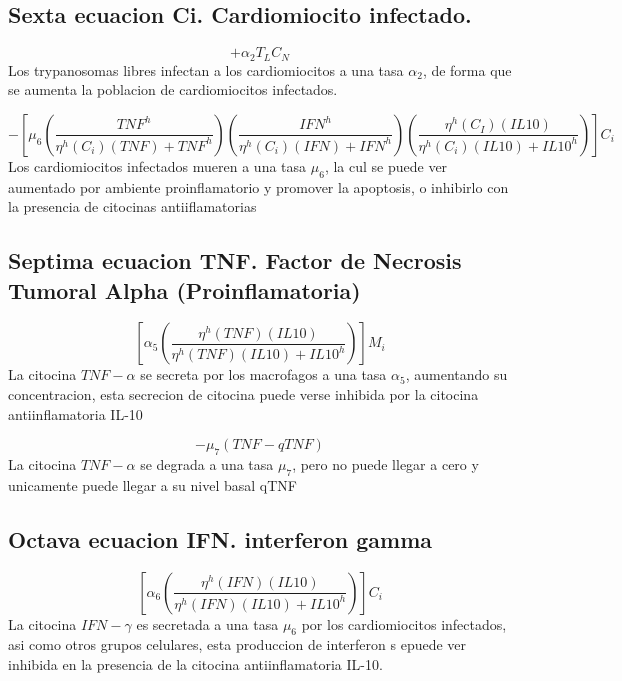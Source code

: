 \documentclass[
]{article}
\begin{document}
\hypertarget{sexta-ecuacion-ci.-cardiomiocito-infectado.}{%
\subsection{Sexta ecuacion Ci. Cardiomiocito
infectado.}\label{sexta-ecuacion-ci.-cardiomiocito-infectado.}}

\[+\alpha_{2}T_{L}C_{N}\] Los trypanosomas libres infectan a los
cardiomiocitos a una tasa \(\alpha_{2}\), de forma que se aumenta la
poblacion de cardiomiocitos infectados.

\[-[\mu_{6}(\dfrac{TNF^{h}}{\eta^{h}(C_{i})(TNF)+TNF^{h}})(\dfrac{IFN^{h}}{\eta^{h}(C_{i})(IFN)+IFN^{h}})(\dfrac{\eta^{h}(C_{I})(IL10)}{\eta^{h}(C_{i})(IL10)+IL10^{h}})]C_{i}\]
Los cardiomiocitos infectados mueren a una tasa \(\mu_{6}\), la cul se
puede ver aumentado por ambiente proinflamatorio y promover la
apoptosis, o inhibirlo con la presencia de citocinas antiiflamatorias

\hypertarget{septima-ecuacion-tnf.-factor-de-necrosis-tumoral-alpha-proinflamatoria}{%
\subsection{Septima ecuacion TNF. Factor de Necrosis Tumoral Alpha
(Proinflamatoria)}\label{septima-ecuacion-tnf.-factor-de-necrosis-tumoral-alpha-proinflamatoria}}

\[[\alpha_{5}(\dfrac{\eta^{h}(TNF)(IL10)}{\eta^{h}(TNF)(IL10)+IL10^{h}})]M_{i}\]
La citocina \(TNF-\alpha\) se secreta por los macrofagos a una tasa
\(\alpha_{5}\), aumentando su concentracion, esta secrecion de citocina
puede verse inhibida por la citocina antiinflamatoria IL-10

\[-\mu_{7}(TNF -qTNF)\] La citocina \(TNF-\alpha\) se degrada a una tasa
\(\mu_{7}\), pero no puede llegar a cero y unicamente puede llegar a su
nivel basal qTNF

\hypertarget{octava-ecuacion-ifn.-interferon-gamma}{%
\subsection{Octava ecuacion IFN. interferon
gamma}\label{octava-ecuacion-ifn.-interferon-gamma}}

\[[\alpha_{6}(\dfrac{\eta^{h}(IFN)(IL10)}{\eta^{h}(IFN)(IL10)+IL10^{h}})]C_{i}\]
La citocina \(IFN-\gamma\) es secretada a una tasa \(\mu_{6}\) por los
cardiomiocitos infectados, asi como otros grupos celulares, esta
produccion de interferon s epuede ver inhibida en la presencia de la
citocina antiinflamatoria IL-10.
\end{document}
